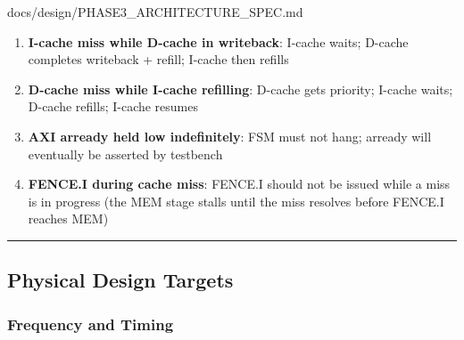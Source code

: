 \begin{relocated}{docs/design/PHASE3_ARCHITECTURE_SPEC.md}
\begin{enumerate}
\def\labelenumi{\arabic{enumi}.}
\tightlist
\item
  \textbf{I-cache miss while D-cache in writeback}: I-cache waits;
  D-cache completes writeback + refill; I-cache then refills
\item
  \textbf{D-cache miss while I-cache refilling}: D-cache gets priority;
  I-cache waits; D-cache refills; I-cache resumes
\item
  \textbf{AXI arready held low indefinitely}: FSM must not hang; arready
  will eventually be asserted by testbench
\item
  \textbf{FENCE.I during cache miss}: FENCE.I should not be issued while
  a miss is in progress (the MEM stage stalls until the miss resolves
  before FENCE.I reaches MEM)
\end{enumerate}

\begin{center}\rule{0.5\linewidth}{0.5pt}\end{center}

\subsection{Physical Design Targets}\label{ds:ch:phase3-architecture:10-physical-design-targets}

\subsubsection{Frequency and Timing}\label{ds:ch:phase3-architecture:101-frequency-and-timing}

{\small\setlength{\tabcolsep}{4pt}

}
\end{relocated}

